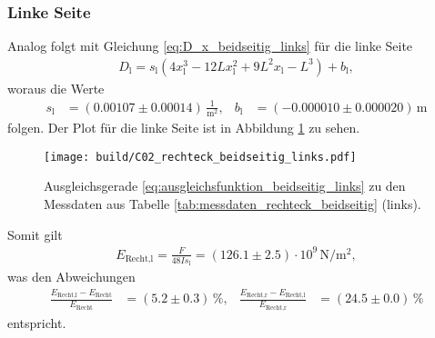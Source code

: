 \subsubsection{Linke Seite}
\label{sec:rechteck_beidseitig_links}
Analog folgt mit Gleichung \eqref{eq:D_x_beidseitig_links} für die linke Seite
\begin{align}
    D_\text{l} = s_\text{l} \left(4 x_\text{l}^3 - 12 L x_\text{l}^2 + 9 L^2 x_\text{l} - L^3\right) + b_\text{l}, 
    \label{eq:ausgleichsfunktion_beidseitig_links}
\end{align}
woraus die Werte 
\begin{align*}
    s_\text{l} &= (\num{0.00107} \pm \num{0.00014}) \, \frac{1}{\unit{\meter^2}}, & 
    b_\text{l} &= (\num{-0.000010} \pm \num{0.000020}) \, \unit{\meter}
\end{align*}
folgen.
Der Plot für die linke Seite ist in Abbildung \ref{fig:plot_rechteck_beidseitig_links}
zu sehen.
%
\begin{figure}[H]
    \centering
    \texttt{[image: build/C02\_rechteck\_beidseitig\_links.pdf]}
    \caption{Ausgleichsgerade \eqref{eq:ausgleichsfunktion_beidseitig_links} zu den Messdaten aus Tabelle \ref{tab:messdaten_rechteck_beidseitig} (links).}
    \label{fig:plot_rechteck_beidseitig_links}
\end{figure}

\noindent
Somit gilt 
\begin{align}
    E_\text{Recht,l} = \frac{F}{48 I s_\text{l}} = (\num{126.1} \pm \num{2.5}) \cdot 10^9 \, \unit{\newton\per\meter^2},
\end{align}
was den Abweichungen 
\begin{align*}
    \frac{E_\text{Recht,l} - E_\text{Recht}}{E_\text{Recht}} &= (\num{5.2} \pm \num{0.3}) \, \%, &
    \frac{E_\text{Recht,r} - E_\text{Recht,l}}{E_\text{Recht,r}} &= (\num{24.5} \pm \num{0.0}) \, \%
\end{align*}
entspricht.
